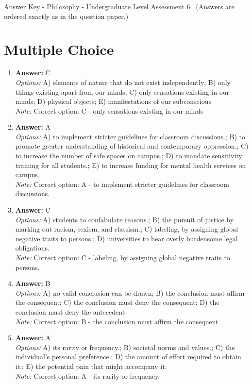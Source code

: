 \documentclass[12pt]{article}
\begin{document}
\begin{center}
Answer Key - Philosophy - Undergraduate Level Assessment 6 \
\small (Answers are ordered exactly as in the question paper.)
\end{center}

\section*{Multiple Choice}
\begin{enumerate}[label=\arabic*.]
\item \textbf{Answer:} C
\\ \textit{Options:} A) elements of nature that do not exist independently; B) only things existing apart from our minds; C) only sensations existing in our minds; D) physical objects; E) manifestations of our subconscious
\\ \textit{Note:} Correct option: C - only sensations existing in our minds
\item \textbf{Answer:} A
\\ \textit{Options:} A) to implement stricter guidelines for classroom discussions.; B) to promote greater understanding of historical and contemporary oppression.; C) to increase the number of safe spaces on campus.; D) to mandate sensitivity training for all students.; E) to increase funding for mental health services on campus.
\\ \textit{Note:} Correct option: A - to implement stricter guidelines for classroom discussions.
\item \textbf{Answer:} C
\\ \textit{Options:} A) students to confabulate reasons.; B) the pursuit of justice by marking out racism, sexism, and classism.; C) labeling, by assigning global negative traits to persons.; D) universities to bear overly burdensome legal obligations.
\\ \textit{Note:} Correct option: C - labeling, by assigning global negative traits to persons.
\item \textbf{Answer:} B
\\ \textit{Options:} A) no valid conclusion can be drawn; B) the conclusion must affirm the consequent; C) the conclusion must deny the consequent; D) the conclusion must deny the antecedent
\\ \textit{Note:} Correct option: B - the conclusion must affirm the consequent
\item \textbf{Answer:} A
\\ \textit{Options:} A) its rarity or frequency.; B) societal norms and values.; C) the individual's personal preference.; D) the amount of effort required to obtain it.; E) the potential pain that might accompany it.
\\ \textit{Note:} Correct option: A - its rarity or frequency.
\end{enumerate}
\end{document}
